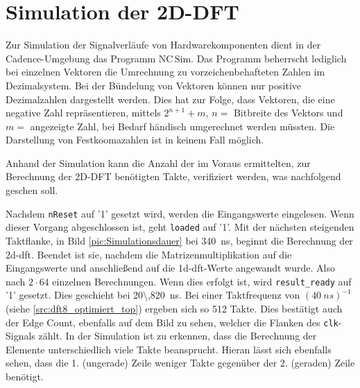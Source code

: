 \section{Simulation der 2D-DFT}
Zur Simulation der Signalverläufe von Hardwarekomponenten dient in der Cadence-Umgebung das Programm NC\,Sim.
Das Programm beherrscht lediglich bei einzelnen Vektoren die Umrechnung zu vorzeichenbehafteten Zahlen im Dezimalsystem.
Bei der Bündelung von Vektoren können nur positive Dezimalzahlen dargestellt werden. Dies hat zur Folge, dass Vektoren, die eine negative Zahl repräsentieren, mittels $2^{n+1}+m$, $n=$ Bitbreite des Vektors und $m=$ angezeigte Zahl, bei Bedarf händisch umgerechnet werden müssten. 
Die Darstellung von Festkoomazahlen ist in keinem Fall möglich.

 Anhand der Simulation kann die Anzahl der im Voraus ermittelten, zur Berechnung der 2D-DFT benötigten Takte, verifiziert werden, was nachfolgend geschen soll.
 
 Nachdem \texttt{nReset} auf '1' gesetzt wird, werden die Eingangswerte
 eingelesen. Wenn dieser Vorgang abgeschlossen ist, geht \texttt{loaded} auf '1'. Mit der nächsten steigenden Taktflanke, in Bild \ref{pic:Simulationsdauer} bei 
 \SI{340}{ns}, beginnt die Berechnung
 der \gls{2d-dft}. Beendet ist sie, nachdem die Matrizenmultiplikation auf die Eingangswerte und anschließend auf die \gls{1d-dft}-Werte angewandt wurde. Also nach $2 \cdot 64$
 einzelnen Berechnungen. Wenn dies erfolgt ist, wird \texttt{result\_ready} auf '1' gesetzt. Dies geschieht bei \SI{20\,820}{ns}. Bei einer Taktfrequenz von $(\SI{40}{ns})^{-1}$
 (siehe \ref{src:dft8_optimiert_top}) ergeben sich so 512 Takte. Dies bestätigt auch der Edge Count, ebenfalls auf dem Bild zu sehen, welcher die Flanken des \texttt{clk}-Signals 
 zählt. In der Simulation ist zu erkennen, dass die Berechnung der Elemente 
 unterschiedlich viele Takte beansprucht. Hieran lässt sich ebenfalls sehen, dass die 1. (ungerade) Zeile weniger Takte gegenüber der 2. (geraden) Zeile benötigt. 
 
 
